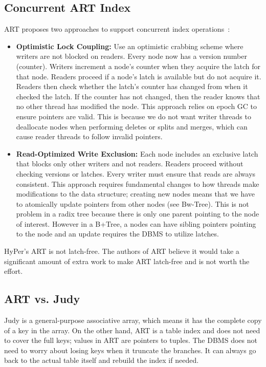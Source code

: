 \documentclass[11pt]{article}
\begin{document}
\subsection*{Concurrent ART Index}
ART proposes two approaches to support concurrent index operations~\cite{Leis}:
\begin{itemize}
    \item \textbf{Optimistic Lock Coupling:} Use an optimistic crabbing scheme where writers are not blocked on readers. Every node now has a version number (counter). Writers increment a node's counter when they acquire the latch for that node. Readers proceed if a node's latch is available but do not acquire it. Readers then check whether the latch's counter has changed from when it checked the latch. If the counter has not changed, then the reader knows that no other thread has modified the node. This approach relies on epoch GC to ensure pointers are valid. This is because we do not want writer threads to deallocate nodes when performing deletes or splits and merges, which can cause reader threads to follow invalid pointers.
    \item \textbf{Read-Optimized Write Exclusion:} Each node includes an exclusive latch that blocks only other writers and not readers. Readers proceed without checking versions or latches. Every writer must ensure that reads are always consistent. This approach requires fundamental changes to how threads make modifications to the data structure; creating new nodes means that we have to atomically update pointers from other nodes (see Bw-Tree). This is not problem in a radix tree because there is only one parent pointing to the node of interest. However in a B+Tree, a nodes can have sibling pointers pointing to the node and an update requires the DBMS to utilize latches.
\end{itemize}
HyPer's ART is not latch-free. The authors of ART believe it would take a significant amount of extra work to make ART latch-free and is not worth the effort.

\subsection*{ART vs. Judy}
Judy is a general-purpose associative array, which means it has the complete copy of a key in the array. On the other hand, ART is a table index and does not need to cover the full keys; values in ART are pointers to tuples. The DBMS does not need to worry about losing keys when it truncate the branches. It can always go back to the actual table itself and rebuild the index if needed.
\end{document}
